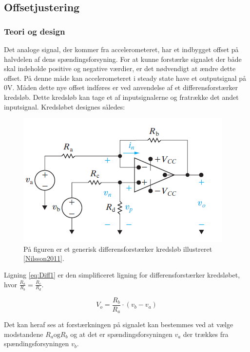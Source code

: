\subsection{Offsetjustering}
\subsubsection{Teori og design}
Det analoge signal, der kommer fra accelerometeret, har et indbygget offset på halvdelen af dens spændingsforsyning. For at kunne forstærke signalet der både skal indeholde positive og negative værdier, er det nødvendigt at ændre dette offset. På denne måde kan  accelerometeret i steady state have et outputsignal på $0$V. Måden dette nye offset indføres er ved anvendelse af et differensforstærker kredsløb. Dette kredsløb kan tage et af inputsignalerne og  fratrække det  andet inputsignal. Kredsløbet designes således:

\begin{figure}[H]
\centering
\includegraphics[scale=1]{figures/cProblemloesning/Differensforstaerker_generisk.png}
\caption{På figuren er et generisk differensforstærker kredsløb illustreret \ref{Nilsson2011}.}
\label{fig:Differensforstaerker_generisk}
\end{figure}

Ligning \ref{eq:Diff1} er den simplificeret ligning for differensforstærker kredsløbet, hvor $\frac{R_a}{R_b} = \frac{R_c}{R_d}$.

\begin{equation}\label{eq:Diff1}
V_o = \frac{R_b}{R_a} \cdot (v_b - v_a)
\end{equation}

Det kan heraf ses at forstærkningen på signalet kan bestemmes ved at vælge modstandene $R_a \text{og} R_b$ og at det er spændingsforsyningen $v_a$ der trækkes fra spændingsforsyningen $v_b$. 

